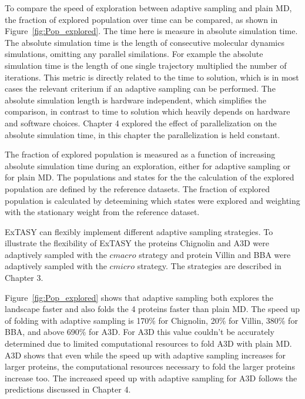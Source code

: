 To compare the speed of exploration between adaptive sampling and plain MD, the fraction of explored population over time can be compared, as shown in Figure~\ref{fig:Pop_explored}. The time here is measure in absolute simulation time. The absolute simulation time is the length of consecutive molecular dynamics simulations, omitting any parallel similations. For example the absolute simulation time is the length of one single trajectory multiplied the number of iterations. This metric is directly related to the time to solution, which is in most cases the relevant criterium if an adaptive sampling can be performed. The absolute simulation length is hardware independent, which simplifies the comparison, in contrast to time to solution which heavily depends on hardware and software choices. Chapter 4 explored the effect of parallelization on the absolute simulation time, in this chapter the parallelization is held constant.

The fraction of explored population is measured as a function of increasing absolute simulation time during an exploration, either for adaptive sampling or for plain MD. The populations and states for the the calculation of the explored population are defined by the reference datasets. The fraction of explored population is calculated by deteemining which states were explored and weighting with the stationary weight from the reference dataset.

ExTASY can flexibly implement different adaptive sampling strategies. To illustrate the flexibility of ExTASY the proteins Chignolin and A3D were adaptively sampled with the $cmacro$ strategy and protein Villin and BBA were adaptively sampled with the $cmicro$ strategy. The strategies are described in Chapter 3. 

Figure~\ref{fig:Pop_explored} shows that adaptive sampling both explores the landscape faster and also folds the 4 proteins faster than plain MD. The speed up of folding with adaptive sampling is 170\% for Chignolin, 20\% for Villin, 380\% for BBA, and above 690\% for A3D. For A3D this value couldn't be accurately determined due to limited computational resources to fold A3D with plain MD. A3D shows that even while the speed up with adaptive sampling increases for larger proteins, the computational resources necessary to fold the larger proteins increase too. The increased speed up with adaptive sampling for A3D follows the predictions discussed in Chapter 4.  

